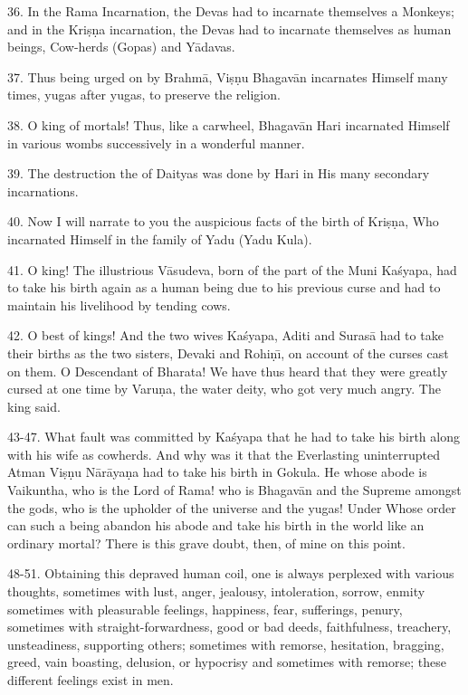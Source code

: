 36. In the Rama Incarnation, the Devas had to incarnate themselves a Monkeys; and in the Kri\d{s}\d{n}a incarnation, the Devas had to incarnate themselves as human beings, Cow-herds (Gopas) and Y\=adavas.

37. Thus being urged on by Brahm\=a, Vi\d{s}\d{n}u Bhagav\=an incarnates Himself many times, yugas after yugas, to preserve the religion.

38. O king of mortals! Thus, like a carwheel, Bhagav\=an Hari incarnated Himself in various wombs successively in a wonderful manner.

39. The destruction the of Daityas was done by Hari in His many secondary incarnations.

40. Now I will narrate to you the auspicious facts of the birth of Kri\d{s}\d{n}a, Who incarnated Himself in the family of Yadu (Yadu Kula).

41. O king! The illustrious V\=asudeva, born of the part of the Muni Ka\'syapa, had to take his birth again as a human being due to his previous curse and had to maintain his livelihood by tending cows.

42. O best of kings! And the two wives Ka\'syapa, Aditi and Suras\=a had to take their births as the two sisters, Devaki and Rohi\d{n}\={\i}, on account of the curses cast on them. O Descendant of Bharata! We have thus heard that they were greatly cursed at one time by Varu\d{n}a, the water deity, who got very much angry. The king said.

43-47. What fault was committed by Ka\'syapa that he had to take his birth along with his wife as cowherds. And why was it that the Everlasting uninterrupted Atman Vi\d{s}\d{n}u N\=ar\=aya\d{n}a had to take his birth in Gokula. He whose abode is Vaikuntha, who is the Lord of Rama! who is Bhagav\=an and the Supreme amongst the gods, who is the upholder of the universe and the yugas! Under Whose order can such a being abandon his abode and take his birth in the world like an ordinary mortal? There is this grave doubt, then, of mine on this point.

48-51. Obtaining this depraved human coil, one is always perplexed with various thoughts, sometimes with lust, anger, jealousy, intoleration, sorrow, enmity sometimes with pleasurable feelings, happiness, fear, sufferings, penury, sometimes with straight-forwardness, good or bad deeds, faithfulness, treachery, unsteadiness, supporting others; sometimes with remorse, hesitation, bragging, greed, vain boasting, delusion, or hypocrisy and sometimes with remorse; these different feelings exist in men.

